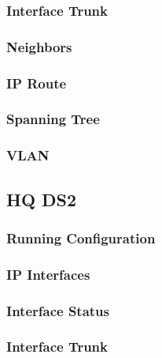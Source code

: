 \subsubsection{Interface Trunk}


\subsubsection{Neighbors}


\subsubsection{IP Route}


\subsubsection{Spanning Tree}


\subsubsection{VLAN}





\subsection{HQ DS2}
\subsubsection{Running Configuration}


\subsubsection{IP Interfaces}


\subsubsection{Interface Status}


\subsubsection{Interface Trunk}


